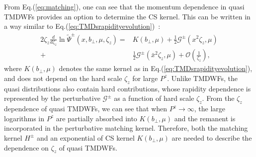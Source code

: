 From Eq.(\ref{eq:matching}), one can see that the momentum dependence in   quasi TMDWFs provides an option to determine the CS kernel. This can be written  in a way similar to Eq.(\ref{eq:TMDsrapidityevolution})~\cite{Ji:2021znw}: 
\begin{align}
	2 \zeta_z \frac{d}{d \zeta_z} \ln \tilde \Psi^{\pm}\left(x, b_{\perp}, \mu, \zeta_z\right)=&K\left(b_{\perp}, \mu\right) +\frac{1}{2}\mathcal{G}^{\pm}\left(x^2\zeta_z,\mu\right) \nonumber\\
	+& \frac{1}{2}\mathcal{G}^{\pm}\left(\bar{x}^2\zeta_z,\mu\right)+\mathcal{O}\left(\frac{1}{\zeta_z}\right), \label{eq:quasiTMDsrapidityevolution}
\end{align}
where $K\left(b_{\perp}, \mu\right)$ denotes the same kernel as in Eq.(\ref{eq:TMDsrapidityevolution}), and does not depend on the hard scale $\zeta_z$ for large $P^z$. Unlike TMDWFs, the  quasi distributions also contain hard contributions, whose  rapidity dependence is  represented by the perturbative  $\mathcal{G}^{\pm}$ as a function of hard scale $\zeta_z$. 
From the $\zeta_z$ dependence of quasi TMDWFs, we can see that when $P^z\to\infty$, the large logarithms in $P^z$ are partially absorbed into $K\left(b_{\perp}, \mu\right)$  and the remanent is incorporated in the perturbative matching kernel. Therefore,  both the matching kernel $H^{\pm}$  and an exponential of  CS kernel $K\left(b_{\perp}, \mu\right)$ are needed to describe the dependence on $\zeta_z$ of quasi TMDWFs. 

